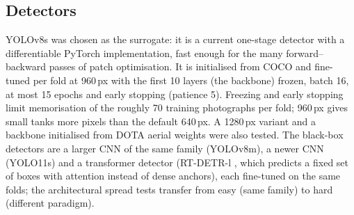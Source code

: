 \documentclass[11pt,a4paper]{article}
\begin{document}
\subsection{Detectors}\label{sec:detectors}
YOLOv8s \cite{yolov8} was chosen as the surrogate: it is a current one-stage detector with a differentiable PyTorch implementation, fast enough for the many forward--backward passes of patch optimisation. It is initialised from COCO \cite{coco} and fine-tuned per fold at 960\,px with the first 10 layers (the backbone) frozen, batch 16, at most 15 epochs and early stopping (patience 5). Freezing and early stopping limit memorisation of the roughly 70 training photographs per fold; 960\,px gives small tanks more pixels than the default 640\,px. A 1280\,px variant and a backbone initialised from DOTA aerial weights \cite{xia2018dota} were also tested. The black-box detectors are a larger CNN of the same family (YOLOv8m), a newer CNN (YOLO11s) and a transformer detector (RT-DETR-l \cite{zhao2024rtdetr}, which predicts a fixed set of boxes with attention instead of dense anchors), each fine-tuned on the same folds; the architectural spread tests transfer from easy (same family) to hard (different paradigm).
\end{document}

